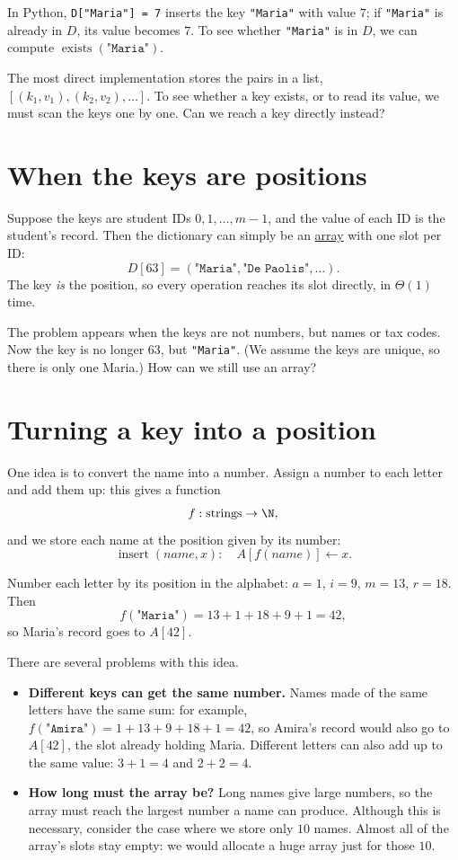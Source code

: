 \documentclass[a4paper,12pt,oneside]{report}
\begin{document}
In Python, \verb|D["Maria"] = 7| inserts the key \verb|"Maria"|
with value $7$; if \verb|"Maria"| is already in $D$, its value
becomes $7$. To see whether \verb|"Maria"| is in $D$, we can compute
$\operatorname{exists}(\texttt{"Maria"})$.

The most direct implementation stores the pairs in a list,
$[(k_1,v_1),(k_2,v_2),\ldots]$. To see whether a key exists, or to
read its value, we must scan the keys one by one. Can we reach a
key directly instead?

\section{When the keys are positions}

Suppose the keys are student IDs $0,1,\ldots,m-1$, and the value of
each ID is the student's record. Then the dictionary can simply be
an \hyperref[def:array]{array} with one slot per ID:
\[
  D[63]=(\texttt{"Maria"},\texttt{"De Paolis"},\ldots).
\]
The key \emph{is} the position, so every operation reaches its slot
directly, in $\Theta(1)$ time.

The problem appears when the keys are not numbers, but names or tax
codes. Now the key is no longer $63$, but \verb|"Maria"|. (We
assume the keys are unique, so there is only one Maria.) How can we
still use an array?

\section{Turning a key into a position}

One idea is to convert the name into a number. Assign a number to
each letter and add them up: this gives a function
\[
  f:\text{strings}\to\N,
\]
and we store each name at the position given by its number:
\[
  \operatorname{insert}(\textit{name},x):\quad A[f(\textit{name})]\gets x.
\]

\begin{framedexample}{}
Number each letter by its position in the alphabet:
$a=1$, $i=9$, $m=13$, $r=18$. Then
\[
  f(\texttt{"Maria"})=13+1+18+9+1=42,
\]
so Maria's record goes to $A[42]$.
\end{framedexample}

There are several problems with this idea.
\begin{itemize}
  \item \textbf{Different keys can get the same number.} Names made
    of the same letters have the same sum: for example,
    $f(\texttt{"Amira"})=1+13+9+18+1=42$, so Amira's record would
    also go to $A[42]$, the slot already holding Maria. Different
    letters can also add up to the same value: $3+1=4$ and $2+2=4$.
  \item \textbf{How long must the array be?} Long names give large
    numbers, so the array must reach the largest number a name can
    produce. Although this is necessary, consider the case where we
    store only $10$ names. Almost all of the array's slots stay
    empty: we would allocate a huge array just for those $10$.
\end{itemize}
\end{document}

